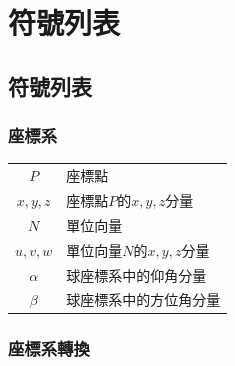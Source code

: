\chapter*{符號列表}
\label{chp:symbol}



\section*{符號列表}
\subsection*{座標系}

\begin{longtable}[l]{cl}
    $P$ & 座標點\\
    $x,y,z$ & 座標點$P$的$x,y,z$分量\\
    $N$ & 單位向量\\
    $u,v,w$ & 單位向量$N$的$x,y,z$分量\\
    $\alpha$ & 球座標系中的仰角分量\\
    $\beta$ & 球座標系中的方位角分量\\
\end{longtable}





\onehalfspacing

\subsection*{座標系轉換}

